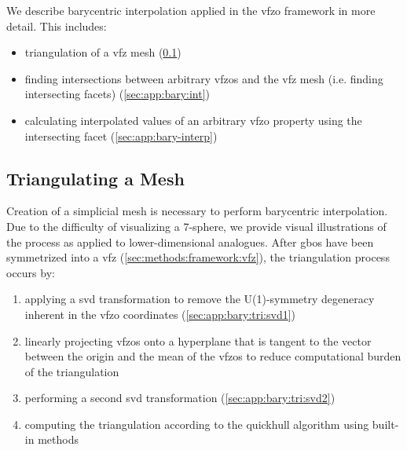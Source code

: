 \documentclass[final,twocolumn,12pt]{elsarticle}
\begin{document}
\begin{appendices}
We describe barycentric interpolation applied in the \gls{vfzo} framework in more detail. This includes:
\begin{itemize}
    \item[1.] triangulation of a \gls{vfz} mesh (\cref{sec:app:bary:tri})
    \item[2.] finding intersections between arbitrary \glspl{vfzo} and the \gls{vfz} mesh (i.e. finding intersecting facets) (\cref{sec:app:bary:int})
    \item[3.] calculating interpolated values of an arbitrary \gls{vfzo} property using the intersecting facet (\cref{sec:app:bary-interp})
\end{itemize}

\subsection{Triangulating a  Mesh}
\label{sec:app:bary:tri}

Creation of a simplicial mesh is necessary to perform barycentric interpolation. Due to the difficulty of visualizing a 7-sphere, we provide visual illustrations of the process as applied to lower-dimensional analogues. After \glspl{gbo} have been symmetrized into a \gls{vfz} (\cref{sec:methods:framework:vfz}), the triangulation process occurs by:
\begin{enumerate}
    \item[1.1] applying a \gls{svd} transformation to remove the U(1)-symmetry degeneracy inherent in the \gls{vfzo} coordinates (\cref{sec:app:bary:tri:svd1})
    \item[1.2] linearly projecting \glspl{vfzo} onto a hyperplane that is tangent to the vector between the origin and the mean of the \inpt{} \glspl{vfzo} to reduce computational burden of the triangulation
    \item[1.3] performing a second \gls{svd} transformation (\cref{sec:app:bary:tri:svd2})
    \item[1.4] computing the triangulation according to the quickhull algorithm \cite{barberQuickhullAlgorithmConvex1996} using built-in methods
\end{enumerate}


\end{appendices}
\end{document}
